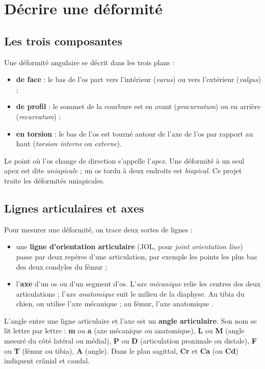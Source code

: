 \section{Décrire une déformité}
\label{sec:deformite}

\subsection{Les trois composantes}

Une déformité angulaire se décrit dans les trois plans :
\begin{itemize}
  \item \textbf{de face} : le bas de l'os part vers l'intérieur (\emph{varus}) ou vers l'extérieur (\emph{valgus}) ;
  \item \textbf{de profil} : le sommet de la courbure est en avant (\emph{procurvatum}) ou en arrière
  (\emph{recurvatum}) ;
  \item \textbf{en torsion} : le bas de l'os est tourné autour de l'axe de l'os par rapport au haut
  (\emph{torsion interne} ou \emph{externe}).
\end{itemize}

Le point où l'os change de direction s'appelle l'\emph{apex}. Une déformité à un seul apex est dite
\emph{uniapicale} ; un os tordu à deux endroits est \emph{biapical}. Ce projet traite les déformités uniapicales.

\subsection{Lignes articulaires et axes}

Pour mesurer une déformité, on trace deux sortes de lignes :
\begin{itemize}
  \item une \textbf{ligne d'orientation articulaire} (JOL, pour \emph{joint orientation line}) passe par deux repères
  d'une articulation, par exemple les points les plus bas des deux condyles du fémur ;
  \item l'\textbf{axe} d'un os ou d'un segment d'os. L'\emph{axe mécanique} relie les centres des deux articulations ;
  l'\emph{axe anatomique} suit le milieu de la diaphyse. Au tibia du chien, on utilise l'axe mécanique ; au fémur,
  l'axe anatomique \cite{tomlinson2007,dismukes2007}.
\end{itemize}

L'angle entre une ligne articulaire et l'axe est un \textbf{angle articulaire}. Son nom se lit lettre par lettre :
\textbf{m} ou \textbf{a} (axe mécanique ou anatomique), \textbf{L} ou \textbf{M} (angle mesuré du côté latéral ou
médial), \textbf{P} ou \textbf{D} (articulation proximale ou distale), \textbf{F} ou \textbf{T} (fémur ou tibia),
\textbf{A} (angle). Dans le plan sagittal, \textbf{Cr} et \textbf{Ca} (ou \textbf{Cd}) indiquent crânial et caudal.

